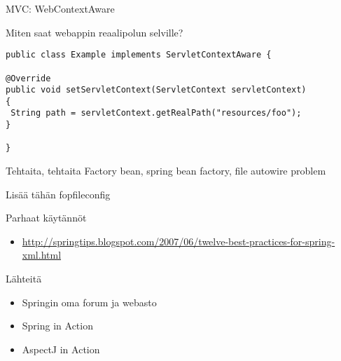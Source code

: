 \documentclass[hyperref={pdfauthor=\AUTHOR},14pt]{beamer}
\author{\AUTHOR}
\title[\TITLE]{\TITLE}
\date{\DATE}
\begin{document}
\begin{frame}[plain]
\titlepage
\end{frame}

\begin{frame}[t,fragile]{MVC: WebContextAware}

Miten saat webappin reaalipolun selville?

\lstset{language=Java,style=Java}
\begin{lstlisting}
public class Example implements ServletContextAware {

@Override
public void setServletContext(ServletContext servletContext)
{
 String path = servletContext.getRealPath("resources/foo");
}

}
\end{lstlisting}
\end{frame}

\begin{frame}[t,fragile]{Tehtaita, tehtaita}
Factory bean, spring bean factory, file autowire problem

Lisää tähän fopfileconfig

\end{frame}

\begin{frame}{Parhaat käytännöt}
\begin{itemize}
\item \url{http://springtips.blogspot.com/2007/06/twelve-best-practices-for-spring-xml.html}
\end{itemize}
\end{frame}

\begin{frame}{Lähteitä}
\begin{itemize}
\item Springin oma forum ja webasto
\item Spring in Action
\item AspectJ in Action
\end{itemize}
\end{frame}
\end{document}

